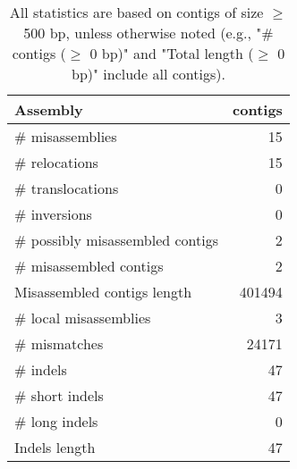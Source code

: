 \documentclass[12pt,a4paper]{article}
\begin{document}
\begin{table}[ht]
\begin{center}
\caption{All statistics are based on contigs of size $\geq$ 500 bp, unless otherwise noted (e.g., "\# contigs ($\geq$ 0 bp)" and "Total length ($\geq$ 0 bp)" include all contigs).}
\begin{tabular}{|l*{1}{|r}|}
\hline
Assembly & contigs \\ \hline
\# misassemblies & 15 \\ \hline
\hspace{5mm}\# relocations & 15 \\ \hline
\hspace{5mm}\# translocations & 0 \\ \hline
\hspace{5mm}\# inversions & 0 \\ \hline
\# possibly misassembled contigs & 2 \\ \hline
\# misassembled contigs & 2 \\ \hline
Misassembled contigs length & 401494 \\ \hline
\# local misassemblies & 3 \\ \hline
\# mismatches & 24171 \\ \hline
\# indels & 47 \\ \hline
\hspace{5mm}\# short indels & 47 \\ \hline
\hspace{5mm}\# long indels & 0 \\ \hline
Indels length & 47 \\ \hline
\end{tabular}
\end{center}
\end{table}
\end{document}
